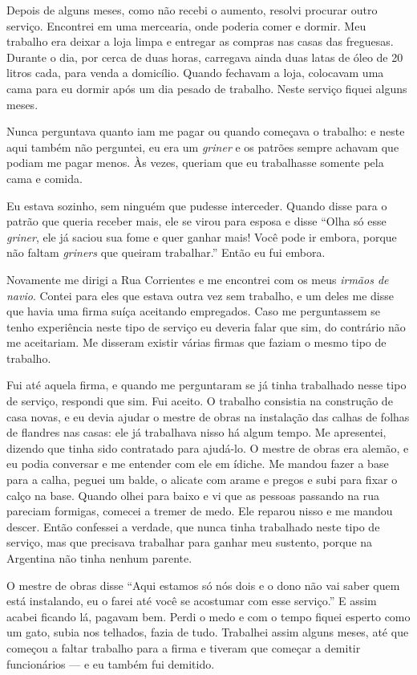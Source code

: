 Depois de alguns meses, como não recebi o aumento, resolvi procurar
outro serviço. Encontrei em uma mercearia, onde poderia comer e dormir. Meu trabalho era deixar a loja limpa e entregar as compras nas
casas das freguesas. Durante o dia, por cerca de duas horas, carregava ainda duas
latas de óleo de 20 litros cada, para venda a domicílio. Quando
fechavam a loja, colocavam uma cama para eu dormir após um dia pesado
de trabalho. Neste serviço fiquei alguns meses. 

Nunca perguntava
quanto iam me pagar ou quando começava o trabalho: e neste aqui também não
perguntei, eu era um \textit{griner} e os patrões sempre achavam que
podiam me pagar menos. Às vezes, queriam que eu trabalhasse somente
pela cama e comida.

Eu estava sozinho, sem ninguém que pudesse interceder. Quando disse
para o patrão que queria receber mais, ele se virou para esposa e
disse ``Olha só esse \textit{griner}, ele já saciou sua fome e quer
ganhar mais! Você pode ir embora, porque não faltam \textit{griners} que
queiram trabalhar.'' Então eu fui embora.

Novamente me dirigi a Rua Corrientes e me encontrei com os meus \textit{irmãos
de navio}. Contei para eles que estava outra vez sem trabalho, e um
deles me disse que havia uma firma suíça aceitando empregados. 
Caso me perguntassem se tenho experiência neste
tipo de serviço eu deveria falar que sim, do contrário não me
aceitariam. Me disseram existir várias firmas que faziam o mesmo
tipo de trabalho.

Fui até aquela firma, e quando me perguntaram se já tinha
trabalhado nesse tipo de serviço, respondi que sim. Fui aceito. O
trabalho consistia na construção de casa novas, e eu devia ajudar o mestre
de obras na instalação das calhas de folhas de flandres nas casas: ele já trabalhava nisso há algum tempo. 
Me apresentei, dizendo
que tinha sido contratado para ajudá-lo. O mestre de obras era alemão, e eu
podia conversar e me entender com ele em ídiche. Me mandou fazer a base
para a calha, peguei um balde, o alicate com arame e pregos e subi para
fixar o calço na base. Quando olhei para baixo e vi que as pessoas
passando na rua pareciam formigas, comecei a tremer de medo. Ele
reparou nisso e me mandou descer. Então confessei a verdade, que
nunca tinha trabalhado neste tipo de serviço, mas que precisava
trabalhar para ganhar meu sustento, porque na Argentina não
tinha nenhum parente.

O mestre de obras disse ``Aqui estamos só nós dois e o dono não vai
saber quem está instalando, eu o farei até você se acostumar com esse
serviço.'' E assim acabei ficando lá, pagavam bem. Perdi o medo e
com o tempo fiquei esperto como um gato, subia nos telhados, fazia de
tudo. Trabalhei assim alguns meses, até que começou a faltar trabalho
para a firma e tiveram que começar a demitir funcionários --- e eu também fui demitido.

